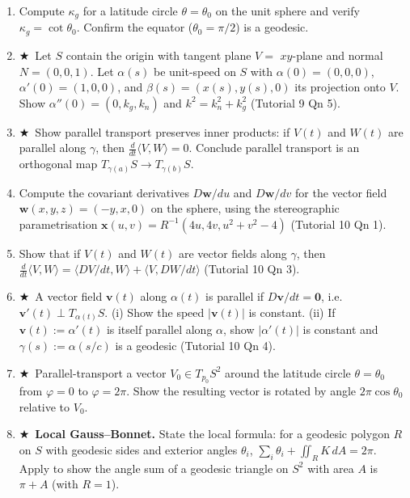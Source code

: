 \documentclass[11pt, a4paper]{article}
\newcommand{\kp}{\kappa}
\newcommand{\hard}{$\bigstar$\ }
\begin{document}
\begin{enumerate}[label=\textbf{Q\arabic*.}, leftmargin=*, itemsep=6pt]
\item Compute $\kp_g$ for a latitude circle $\theta=\theta_0$ on the unit sphere and verify $\kp_g=\cot\theta_0$. Confirm the equator ($\theta_0=\pi/2$) is a geodesic.

\item \hard Let $S$ contain the origin with tangent plane $V=$ $xy$-plane and normal $N=(0,0,1)$. Let $\alpha(s)$ be unit-speed on $S$ with $\alpha(0)=(0,0,0)$, $\alpha'(0)=(1,0,0)$, and $\beta(s)=(x(s),y(s),0)$ its projection onto $V$. Show $\alpha''(0)=(0,k_g,k_n)$ and $k^2=k_n^2+k_g^2$ (Tutorial 9 Qn 5).

\item \hard Show parallel transport preserves inner products: if $V(t)$ and $W(t)$ are parallel along $\gamma$, then $\frac{d}{dt}\langle V,W\rangle=0$. Conclude parallel transport is an orthogonal map $T_{\gamma(a)}S\to T_{\gamma(b)}S$.

\item Compute the covariant derivatives $D\mathbf{w}/du$ and $D\mathbf{w}/dv$ for the vector field $\mathbf{w}(x,y,z)=(-y,x,0)$ on the sphere, using the stereographic parametrisation $\mathbf{x}(u,v)=R^{-1}(4u,4v,u^2+v^2-4)$ (Tutorial 10 Qn 1).

\item Show that if $V(t)$ and $W(t)$ are vector fields along $\gamma$, then $\frac{d}{dt}\langle V,W\rangle=\langle DV/dt,W\rangle+\langle V,DW/dt\rangle$ (Tutorial 10 Qn 3).

\item \hard A vector field $\mathbf{v}(t)$ along $\alpha(t)$ is parallel if $D\mathbf{v}/dt=\mathbf{0}$, i.e.\ $\mathbf{v}'(t)\perp T_{\alpha(t)}S$. (i) Show the speed $|\mathbf{v}(t)|$ is constant. (ii) If $\mathbf{v}(t):=\alpha'(t)$ is itself parallel along $\alpha$, show $|\alpha'(t)|$ is constant and $\gamma(s):=\alpha(s/c)$ is a geodesic (Tutorial 10 Qn 4).

\item \hard Parallel-transport a vector $V_0\in T_{p_0}S^2$ around the latitude circle $\theta=\theta_0$ from $\varphi=0$ to $\varphi=2\pi$. Show the resulting vector is rotated by angle $2\pi\cos\theta_0$ relative to $V_0$.

\item \hard \textbf{Local Gauss--Bonnet.} State the local formula: for a geodesic polygon $R$ on $S$ with geodesic sides and exterior angles $\theta_i$, $\sum_i\theta_i+\iint_R K\,dA=2\pi$. Apply to show the angle sum of a geodesic triangle on $S^2$ with area $A$ is $\pi+A$ (with $R=1$).


\end{enumerate}
\end{document}

